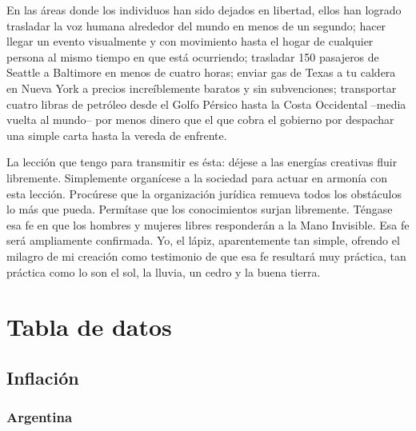\documentclass[12pt,a4paper,twoside]{book}
\begin{document}
En las áreas donde los individuos han sido dejados en libertad, ellos han logrado trasladar la voz humana alrededor del mundo en menos de un segundo; hacer llegar un evento visualmente y con movimiento hasta el hogar de cualquier persona al mismo tiempo en que está ocurriendo; trasladar 150 pasajeros de Seattle a Baltimore en menos de cuatro horas; enviar gas de Texas a tu caldera en Nueva York a precios increíblemente baratos y sin subvenciones; transportar cuatro libras de petróleo desde el Golfo Pérsico hasta la Costa Occidental –media vuelta al mundo– por menos dinero que el que cobra el gobierno por despachar una simple carta hasta la vereda de enfrente.

La lección que tengo para transmitir es ésta: déjese a las energías creativas fluir libremente. Simplemente organícese a la sociedad para actuar en armonía con esta lección. Procúrese que la organización jurídica remueva todos los obstáculos lo más que pueda. Permítase que los conocimientos surjan libremente. Téngase esa fe en que los hombres y mujeres libres responderán a la Mano Invisible. Esa fe será ampliamente confirmada. Yo, el lápiz, aparentemente tan simple, ofrendo el milagro de mi creación como testimonio de que esa fe resultará muy práctica, tan práctica como lo son el sol, la lluvia, un cedro y la buena tierra.

\chapter{Tabla de datos}
\section{Inflación}
\subsection{Argentina}

\end{document}
